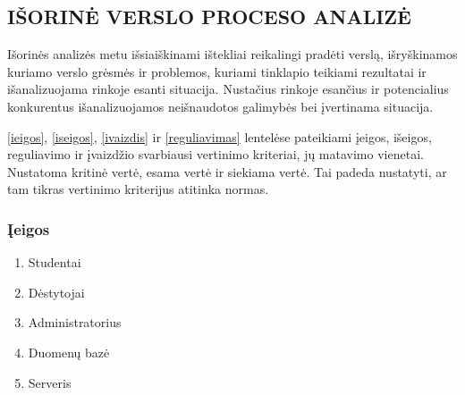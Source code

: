 \documentclass{VUMIFPSkursinis}
\begin{document}
\newpage
\subsection{IŠORINĖ VERSLO PROCESO ANALIZĖ}
Išorinės analizės metu išsiaiškinami ištekliai
reikalingi pradėti verslą, išryškinamos kuriamo verslo grėsmės ir
problemos, kuriami tinklapio teikiami rezultatai ir išanalizuojama rinkoje esanti situacija. Nustačius rinkoje esančius ir potencialius konkurentus išanalizuojamos
neišnaudotos galimybės bei įvertinama situacija.

\ref{ieigos}, \ref{iseigos}, \ref{ivaizdis} ir \ref{reguliavimas} lentelėse pateikiami įeigos, išeigos, reguliavimo ir įvaizdžio svarbiausi vertinimo kriteriai,
jų matavimo vienetai. Nustatoma kritinė vertė, esama vertė ir siekiama vertė. Tai padeda
nustatyti, ar tam tikras vertinimo kriterijus atitinka normas.
\subsubsection{Įeigos}
\begin{enumerate}
	\item Studentai
	\item Dėstytojai
	\item Administratorius
	\item Duomenų bazė
	\item Serveris
\end{enumerate}
\begin{table}[H]
	\centering
	\caption{Įeigos}
	\label{ieigos}
\end{table}
\end{document}
